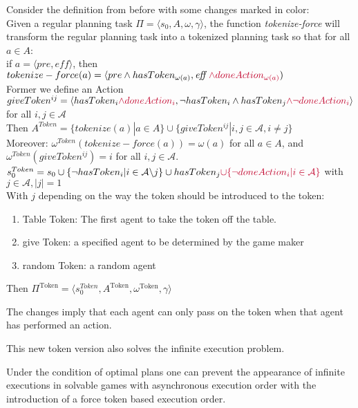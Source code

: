 Consider the definition from before with some changes marked in color: \\
Given a regular planning task $\Pi = \langle s_0, A, \omega, \gamma \rangle $, the function \textit{tokenize-force} will transform the regular planning task into a tokenized planning task so that for all $a \in A$: \\
 if $a = \langle pre, \textit{eff} \rangle$, then
   $tokenize-force(a) =\langle pre \wedge hasToken_{\omega(a)}, \textit{eff } {\color{UniRed} \wedge doneAction_{\omega(a)}})$ \\
Former we define an Action
    $ giveToken^{ij} = \langle hasToken_i {\color{UniRed}\wedge doneAction_i}, \neg hasToken_i \wedge hasToken_j {\color{UniRed} \wedge \neg doneAction_i} \rangle $
    for all $i,j \in \mathcal{A}$
    \\
Then $ A^{Token}=\{tokenize(a)|a \in A\} \cup \{giveToken^{ij}|i,j \in \mathcal{A}, i \not = j\}
$ \\
Moreover: $\omega^{Token}(tokenize-force(a))= \omega(a)$ for all $a \in A$,
and $\omega^{Token}(giveToken^{ij}) = i$ for all $i,j \in \mathcal{A}$. \\
$s_0^{Token} = s_0 \cup \{\neg hasToken_i|i \in \mathcal{A} \backslash j\} \cup hasToken_j {\color{UniRed} \cup  \{ \neg doneAction_i| i \in \mathcal{A} \}}$ with $j \in \mathcal{A}, |j|=1$\\
With $j$ depending on the way the token should be introduced to the token:
\begin{enumerate}
  \item Table Token:
    The first agent to take the token off the table.
  \item give Token:
    a specified agent to be determined by the game maker
  \item random Token:
    a random agent
\end{enumerate}
Then $ \Pi^{\text{Token}} = \langle s_0^{Token}, A ^{\text{Token}}, \omega ^{\text{Token}}, \gamma \rangle $

The changes imply that each agent can only pass on the token when that agent has performed an action.

This new token version also solves the infinite execution problem.

\begin{theorem}
  Under the condition of optimal plans one can prevent the appearance of infinite executions in solvable games with asynchronous execution order with the introduction of a force token based execution order.
\end{theorem}

